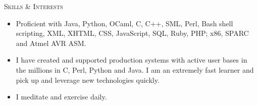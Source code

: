 \documentclass[letter]{article}
\begin{document}
\begin{description}
	\item \textsc{Skills \& Interests}
          \begin{itemize}
            \item Proficient with Java, Python, OCaml, C, C++, SML, Perl, Bash shell scripting, XML, XHTML, CSS, JavaScript, SQL, Ruby, PHP; x86, SPARC and Atmel AVR ASM.
            \item I have created and supported production systems with active user bases in the millions in C, Perl, Python and Java. I am an extremely fast learner and pick up and leverage new technologies quickly.
            \item I meditate and exercise daily.
          \end{itemize}

\end{description} %
  
\end{document}
